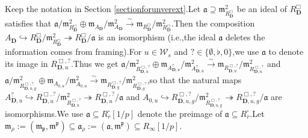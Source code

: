 \documentclass[10pt]{article}
\newcommand{\Dpik}{{\mathbf{D}}}
\newcommand{\fa}{{\mathfrak{a}}}
\newcommand{\fm}{{\mathfrak{m}}}
\newcommand{\fp}{{\mathfrak{p}}}
\newcommand{\sW}{\mathscr W}
\begin{document}
Keep the notation in Section \ref{sectionforunverext}.\;Let $\fa\supseteq\fm^2_{R^{\Box}_{\Dpik}}$ be an ideal of $R^{\Box}_{\Dpik}$ satisfies that $\fa/\fm^2_{R^{\Box}_{\Dpik}}\oplus \fm_{A_{\Dpik}}/\fm^2_{A_{\Dpik}}\xrightarrow{\sim } \fm_{R^{\Box}_{\Dpik}}/\fm^2_{R^{\Box}_{\Dpik}}$.\;Then the composition $A_{\Dpik}\hookrightarrow R^{\Box}_{\Dpik}/\fm^2_{R^{\Box}_{\Dpik}}\twoheadrightarrow R^{\Box}_{\Dpik}/\fa$ is an isomorphism (i.e.,\;the ideal $\fa$ deletes the information comes from framing).\;For $u\in \sW_s$ and $?\in\{\emptyset,\flat,0\}$,\;we use $\fa$ to denote its image in $R^{\Box,?}_{\Dpik,u}$.\;Thus we get $\fa/\fm^2_{R^{\Box,?}_{\Dpik,u}}\oplus \fm_{A^{?}_{\Dpik,u}}/\fm^2_{A^{?}_{\Dpik,u}}\xrightarrow{\sim } \fm_{R^{\Box,?}_{\Dpik,u}}/\fm^2_{R^{\Box,?}_{\Dpik,u}}$ and $\fa/\fm^2_{R^{\Box,?}_{\Dpik,u,g}}\oplus \fm_{A_{0,u}}/\fm^2_{A_{0,u}}\xrightarrow{\sim } \fm_{R^{\Box,?}_{\Dpik,g}}/\fm^2_{R^{\Box,?}_{\Dpik,g}}$,\;so that the natural maps
$A^{?}_{\Dpik,u}\hookrightarrow R^{\Box,?}_{\Dpik,u}/\fm^2_{R^{\Box,?}_{\Dpik,u}}\twoheadrightarrow R^{\Box,?}_{\Dpik,u}/\fa$ and $A_{0,u}\hookrightarrow R^{\Box,?}_{\Dpik,u,g}/\fm^2_{R^{\Box,?}_{\Dpik,u,g}}\twoheadrightarrow R^{\Box,?}_{\Dpik,u,g}/\fa$ are isomorphisms.\;We use $\fa\subseteq R_{\overline{r}}^{\square}[1/p]$ denote the preimage of $\fa\subseteq R_{\overline{r}}^{\square}$.\;Let $\fm_{\rho}:=(\fm_{\fp},\fm^{\fp})\subseteq\fa_{\rho}:=(\fa,\fm^{\fp})\subseteq R_{\infty}[1/p]$.\;
\end{document}
